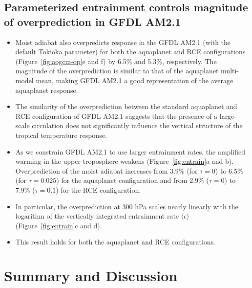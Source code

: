 \documentclass{ametsocV5}
\begin{document}
\subsection{Parameterized entrainment controls magnitude of overprediction in GFDL AM2.1}
\begin{itemize}
\item Moist adiabat also overpredicts response in the GFDL AM2.1 (with the default Tokioka parameter) for both the aquaplanet and RCE configurations (Figure~\ref{fig:aogcm-op}e and f) by 6.5\% and 5.3\%, respectively. The magnitude of the overprediction is similar to that of the aquaplanet multi-model mean, making GFDL AM2.1 a good representation of the average aquaplanet response.
\item The similarity of the overprediction between the standard aquaplanet and RCE configuration of GFDL AM2.1 suggests that the presence of a large-scale circulation does not significantly influence the vertical structure of the tropical temperature response.
\item As we constrain GFDL AM2.1 to use larger entrainment rates, the amplified warming in the upper troposphere weakens (Figure~\ref{fig:entrain}a and b). Overprediction of the moist adiabat increases from 3.9\% (for $\tau = 0$) to 6.5\% (for $\tau = 0.025$) for the aquaplanet configuration and from 2.9\% ($\tau = 0$) to 7.9\% ($\tau = 0.1$) for the RCE configuration.
\item In particular, the overprediction at 300 hPa scales nearly linearly with the logarithm of the vertically integrated entrainment rate $\langle \epsilon \rangle$ (Figure~\ref{fig:entrain}c and d).
\item This result holds for both the aquaplanet and RCE configurations. 
\end{itemize}

\section{Summary and Discussion}
\end{document}
